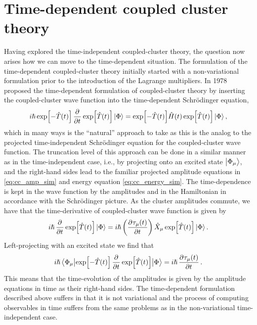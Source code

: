     \section{Time-dependent coupled cluster theory}
        Having explored the time-independent coupled-cluster theory, the
        question now arises how we can move to the time-dependent situation.
        The formulation of the time-dependent coupled-cluster theory initially
        started with a non-variational formulation prior to the introduction of
        the Lagrange multipliers.
        In 1978 \citeauthor{tdcc-hoodbhoy} \cite{tdcc-hoodbhoy, tdcc-hoodbhoy-2}
        proposed the time-dependent formulation of coupled-cluster theory by
        inserting the coupled-cluster wave function into the time-dependent
        Schrödinger equation,
        \begin{align}
            i\hslash
            \exp[-\clust(t)]\dpd{}{t}\exp[\clust(t)]\ket{\slat}
            = \exp[-\clust(t)]\hamil(t)\exp[\clust(t)]\ket{\slat},
        \end{align}
        which in many ways is the ``natural'' approach to take as this is the
        analog to the projected time-independent Schrödinger equation for the
        coupled-cluster wave function.
        The truncation level of this approach can be done in a similar manner as
        in the time-independent case, i.e., by projecting onto an excited state
        $\ket{\Phi_{\mu}}$, and the right-hand sides lead to the familiar
        projected amplitude equations in \autoref{eq:cc_amp_sim} and energy
        equation \autoref{eq:cc_energy_sim}.
        The time-dependence is kept in the wave function by the amplitudes and
        in the Hamiltonian in accordance with the Schrödinger picture.
        As the cluster amplitudes commute, we have that the time-derivative of
        coupled-cluster wave function is given by
        \begin{align}
            i\hslash\dpd{}{t}\exp[\clust(t)]\ket{\slat}
            = i\hslash \para{
                \dpd{\clustamp_{\mu}(t)}{t}
            }
            \hat{X}_{\mu}
            \exp[\clust(t)]\ket{\slat}.
        \end{align}
        Left-projecting with an excited state we find that
        \begin{align}
            i\hslash
            \mel{\slat_{\mu}}{
                \exp[-\clust(t)]
                \dpd{}{t}
                \exp[\clust(t)]
            }{\slat}
            =
            i\hslash
            \dpd{\clustamp_{\mu}(t)}{t}.
            \label{eq:td-clustamp}
        \end{align}
        This means that the time-evolution of the amplitudes is given by the
        amplitude equations in time as their right-hand sides.
        The time-dependent formulation described above suffers in that it is not
        variational \cite{tdcc-hoodbhoy, tdcc-hoodbhoy-2, tdcc-huber} and the
        process of computing observables in time suffers from the same problems
        as in the non-variational time-independent case.

